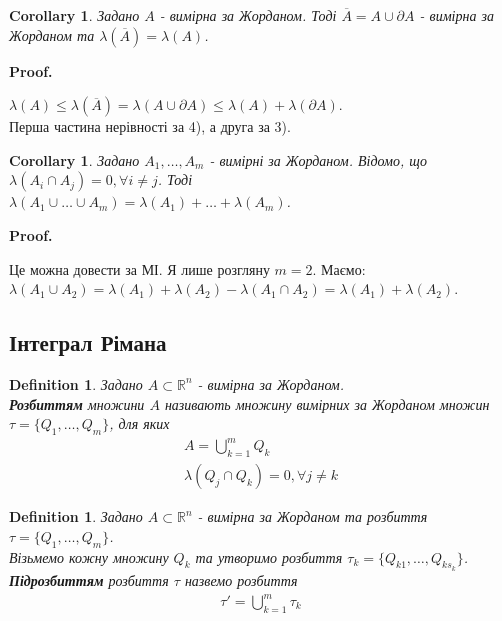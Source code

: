 \documentclass[a4paper, 10pt]{article}
\makeatletter
\def\qed{$\blacksquare$}
\theoremstyle{theoremdd}
\theoremstyle{theoremdd}
\newtheorem{definition}[theorem]{Definition}
\theoremstyle{theoremdd}
\theoremstyle{theoremdd}
\theoremstyle{theoremdd}
\theoremstyle{theoremdd}
\theoremstyle{theoremdd}
\theoremstyle{theoremdd}
\newtheorem{corollary}[theorem]{Corollary}
\renewenvironment{proof}[1][Proof.\\]{\par
\pushQED{\hfill \qed}%
\normalfont \topsep6\p@\@plus6\p@\relax
\trivlist
\item\relax
{\bfseries
#1\@addpunct{.}}\hspace\labelsep\ignorespaces
}{%
\popQED\endtrivlist\@endpefalse
}
\makeatother
\begin{document}
\begin{corollary}
Задано $A$ - вимірна за Жорданом. Тоді $\overline{A} = A \cup \partial A$ - вимірна за Жорданом та $\lambda(\overline{A}) = \lambda(A)$.
\end{corollary}

\begin{proof}
$\lambda(A) \leq \lambda(\overline{A}) = \lambda(A \cup \partial A) \leq \lambda(A) + \lambda(\partial A)$.\\
Перша частина нерівності за 4), а друга за 3).
\end{proof}

\begin{corollary}
Задано $A_1,\dots,A_m$ - вимірні за Жорданом. Відомо, що $\lambda(A_i \cap A_j) = 0, \forall i \neq j$. Тоді\\
$\lambda(A_1 \cup \dots \cup A_m) = \lambda(A_1) + \dots + \lambda(A_m)$.
\end{corollary}

\begin{proof}
Це можна довести за МІ. Я лише розгляну $m = 2$. Маємо:\\
$\lambda(A_1 \cup A_2) = \lambda(A_1) + \lambda(A_2) - \lambda(A_1 \cap A_2) = \lambda(A_1) + \lambda(A_2)$.
\end{proof}

\subsection{Інтеграл Рімана}
\begin{definition}
Задано $A \subset \mathbb{R}^n$ - вимірна за Жорданом.\\
\textbf{Розбиттям} множини $A$ називають множину вимірних за Жорданом множин $\tau = \{Q_1,\dots,Q_m\}$, для яких
\begin{align*}
A = \bigcup_{k=1}^m Q_k \\
\lambda(Q_j \cap Q_k) = 0, \forall j \neq k
\end{align*}
\end{definition}

\begin{definition}
Задано $A \subset \mathbb{R}^n$ - вимірна за Жорданом та розбиття $\tau = \{Q_1,\dots,Q_m\}$.\\
Візьмемо кожну множину $Q_k$ та утворимо розбиття $\tau_k = \{Q_{k1},\dots,Q_{ks_k}\}$.\\
\textbf{Підрозбиттям} розбиття $\tau$ назвемо розбиття
\begin{align*}
\tau' = \bigcup_{k=1}^m \tau_k
\end{align*}
\end{definition}
\end{document}
